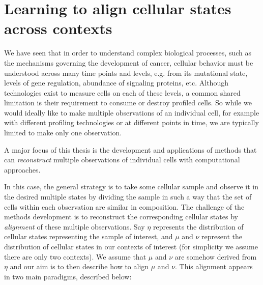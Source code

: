 \section{Learning to align cellular states across contexts}
We have seen that in order to understand complex biological processes, such as the mechanisms governing the development of cancer, cellular behavior must be understood across many time points and levels, e.g. from its mutational state, levels of gene regulation, abundance of signaling proteins, etc.
Although technologies exist to measure cells on each of these levels,
a common shared limitation is their requirement to consume or destroy profiled cells.
So while we would ideally like to make multiple observations of an individual cell, for example with different profiling technologies or at different points in time, we are typically limited to make only one observation.

A major focus of this thesis is the development and applications of methods that can \emph{reconstruct} multiple observations of individual cells with computational approaches.

In this case, the general strategy is to take some cellular sample
and observe it in the desired multiple states
by dividing the sample in such a way that the set of cells within each observation are similar in composition.
The challenge of the methods development is to reconstruct the corresponding cellular states by \emph{alignment} of these multiple observations.
Say $\eta$ represents the distribution of cellular states representing the sample of interest, and $\mu$ and $\nu$ represent the distribution of cellular states in our contexts of interest (for simplicity we assume there are only two contexts).
We assume that $\mu$ and $\nu$ are somehow derived from $\eta$ and our aim is to then describe how to align $\mu$ and $\nu$.
This alignment appears in two main paradigms, described below:

